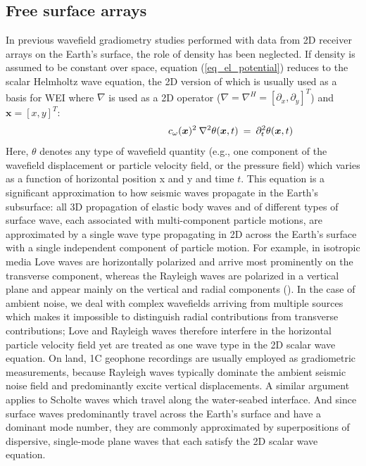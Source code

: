 \documentclass[]{article}
\begin{document}
	\subsection{Free surface arrays}\label{methS}
	In previous wavefield gradiometry studies performed with data from 2D receiver arrays on the Earth's surface, the role of density has been neglected. If density is assumed to be constant over space, equation (\ref{eq_el_potential}) reduces to the scalar Helmholtz wave equation, the 2D version of which is usually used as a basis for WEI where $\nabla$ is used as a 2D operator ($\nabla = \nabla^{H} = [\partial_{x}, \partial_{y}]^{T}$) and $\bm{x} = [x,y]^{T}$:
	\begin{align}\label{eq:helm}
		\shoveright \shoveright \shoveright \shoveright \shoveright \shoveright \shoveright \shoveright \shoveright \shoveright%
		\: \; \; c_{\omega}(\bm{x})^{2} \: \nabla^{2} \theta(\bm{x},t) &\: = \: \partial_{t}^{2}\theta(\bm{x},t)
	\end{align}
	Here, $\theta$ denotes any type of wavefield quantity (e.g., one component of the wavefield displacement or particle velocity field, or the pressure field) which varies as a function of horizontal position x and y and time $t$. This equation is a significant approximation to how seismic waves propagate in the Earth's subsurface: all 3D propagation of elastic body waves and of different types of surface wave, each associated with multi-component particle motions, are approximated by a single wave type propagating in 2D across the Earth's surface with a single independent component of particle motion. For example, in isotropic media Love waves are horizontally polarized and arrive most prominently on the transverse component, whereas the Rayleigh waves are polarized in a vertical plane and appear mainly on the vertical and radial components (\cite{shearer2019introduction}). In the case of ambient noise, we deal with complex wavefields arriving from multiple sources which makes it impossible to distinguish radial contributions from transverse contributions; Love and Rayleigh waves therefore interfere in the horizontal particle velocity field yet are treated as one wave type in the 2D scalar wave equation. On land, 1C geophone recordings are usually employed as gradiometric measurements, because Rayleigh waves typically dominate the ambient seismic noise field and predominantly excite vertical displacements. A similar argument applies to Scholte waves which travel along the water-seabed interface. And since surface waves predominantly travel across the Earth's surface and have a dominant mode number, they are commonly approximated by superpositions of dispersive, single-mode plane waves that each satisfy the 2D scalar wave equation. \\%
	
\end{document}
